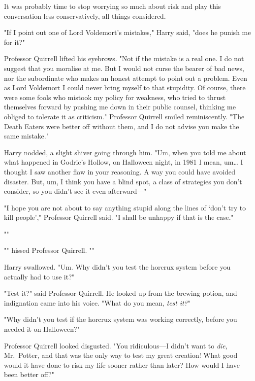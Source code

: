 It was probably time to stop worrying so much about risk and play this 
conversation less conservatively, all things considered.

"If I point out one of Lord Voldemort's mistakes," Harry said, "does he punish 
me for it?"

Professor Quirrell lifted his eyebrows. "Not if the mistake is a real one. I do 
not suggest that you moralise at me. But I would not curse the bearer of bad 
news, nor the subordinate who makes an honest attempt to point out a problem. 
Even as Lord Voldemort I could never bring myself to that stupidity. Of course, 
there were some fools who mistook my policy for weakness, who tried to thrust 
themselves forward by pushing me down in their public counsel, thinking me 
obliged to tolerate it as criticism." Professor Quirrell smiled reminiscently. 
"The Death Eaters were better off without them, and I do not advise you make 
the same mistake."

Harry nodded, a slight shiver going through him. "Um, when you told me about 
what happened in Godric's Hollow, on Halloween night, in 1981 I mean, 
um{\ldots} I thought I saw another flaw in your reasoning. A way you could have 
avoided disaster. But, um, I think you have a blind spot, a class of strategies 
you don't consider, so you didn't see it even afterward---"

"I hope you are not about to say anything stupid along the lines of `don't try 
to kill people'," Professor Quirrell said. "I shall be unhappy if that is the 
case."

""

"" hissed Professor Quirrell. ""

Harry swallowed. "Um. Why didn't you test the horcrux system before you 
actually had to use it?"

"Test it?" said Professor Quirrell. He looked up from the brewing potion, and 
indignation came into his voice. "What do you mean, \emph{test it?}"

"Why didn't you test if the horcrux system was working correctly, before you 
needed it on Halloween?"

Professor Quirrell looked disgusted. "You ridiculous---I didn't want to 
\emph{die,} Mr.~Potter, and that was the only way to test my great creation! 
What good would it have done to risk my life sooner rather than later? How 
would I have been better off?"


